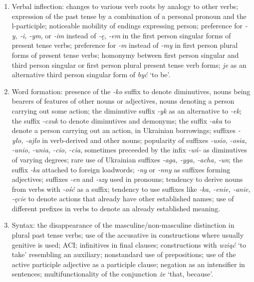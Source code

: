 \begin{enumerate}
    \item Verbal inflection: changes to various verb roots by analogy to other verbs; expression of the past tense by a combination of a personal pronoun and the l-participle; noticeable mobility of endings expressing person; preference for \textit{-y, -i, -ym}, or \textit{-im} instead of \textit{-ę, -em} in the first person singular forms of present tense verbs; preference for \textit{-m} instead of \textit{-my} in first person plural forms of present tense verbs; homonymy between first person singular and third person singular or first person plural present tense verb forms; \textit{je} as an alternative third person singular form of \textit{być} `to be'.

    \item Word formation: presence of the \textit{-ko} suffix to denote diminutives, nouns being bearers of features of other nouns or adjectives, nouns denoting a person carrying out some action; the diminutive suffix \textit{-yk} as an alternative to \textit{-ek}; the suffix \textit{-czuk} to denote diminutives and demonyms; the suffix \textit{-aka} to denote a person carrying out an action, in Ukrainian borrowings; suffixes \textit{-yło, -ajło} in verb-derived and other nouns; popularity of suffixes \textit{-usio, -osia, -unio, -unia, -cio, -cia}, sometimes preceeded by the infix \textit{-uń-} as diminutives of varying degrees; rare use of Ukrainian suffixes \textit{-aga, -yga, -acha, -un}; the suffix \textit{-ka} attached to foreign loadwords; \textit{-ny} or \textit{-nny} as suffixes forming adjectives; suffixes \textit{-en} and \textit{-szy} used in pronouns; tendency to derive nouns from verbs with \textit{-ość} as a suffix; tendency to use suffixes like \textit{-ka, -enie, -anie, -ęcie} to denote actions that already have other established names; use of different prefixes in verbs to denote an already established meaning.

    \item Syntax: the disappearance of the masculine/non-masculine distinction in plural past tense verbs; use of the accusative in constructions where usually genitive is used; ACI; infinitives in final clauses; constructions with \textit{wziąć} `to take' resembling an auxiliary; nonstandard use of prepositions; use of the active participle adjective as a participle clause; negation as an intensifier in sentences; multifunctionality of the conjunction \textit{że} `that, because'.
\end{enumerate}

